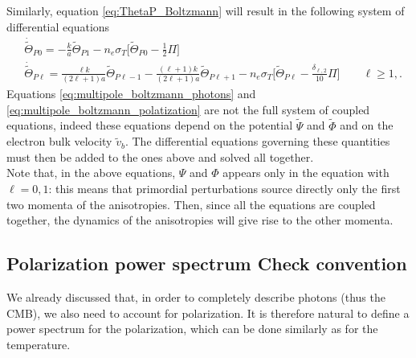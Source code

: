 Similarly, equation \eqref{eq:ThetaP_Boltzmann} will result in the following system of differential equations
\begin{subequations}\label{eq:multipole_boltzmann_polatization}
    \begin{align}
           &\dot{\tilde{\Theta}}_{P0}=-\frac{k}{a}\tilde{\Theta}_{P1}-n_e\sigma_T\bigg[\tilde\Theta_{P0}-\frac{1}{2}\Pi\bigg]\label{eq:multipole_boltzmann_polatization_0}\\
            &\dot{\tilde{\Theta}}_{P\ell}=\frac{\ell k}{(2\ell+1)a}\tilde\Theta_{P\ell-1}-\frac{(\ell+1)k}{(2\ell+1)a}\tilde\Theta_{P\ell+1}-n_e\sigma_T\bigg[\tilde\Theta_{P\ell}-\frac{\delta_{\ell,2}}{10}\Pi\bigg]\qquad \ell\geq 1,\label{eq:multipole_boltzmann_polatization_2}.
        \end{align}
\end{subequations}  
Equations \eqref{eq:multipole_boltzmann_photons} and \eqref{eq:multipole_boltzmann_polatization} are not the full system of coupled equations, indeed these equations depend on the potential $\tilde\Psi$ and $\tilde\Phi$ and on the electron bulk velocity $\tilde v_b$. The differential equations governing these quantities must then be added to the ones above and solved all together.\\
Note that, in the above equations, $\Psi$ and $\Phi$ appears only in the equation with $\ell=0,1$: this means that primordial perturbations source directly only the first two momenta of the anisotropies. Then, since all the equations are coupled together, the dynamics of the anisotropies will give rise to the other momenta.
\subsection{Polarization power spectrum Check convention}\label{sec:PolarizationPowerSpectrum}
We already discussed that, in order to completely describe photons (thus the CMB), we also need to account for polarization. It is therefore natural to define a power spectrum for the polarization, which can be done similarly as for the temperature.

